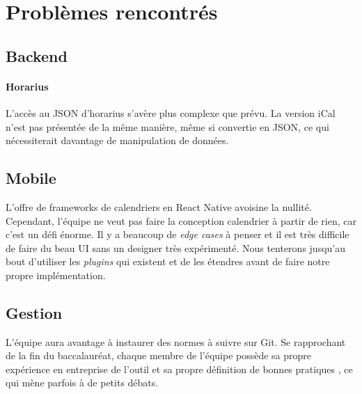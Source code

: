 \section{Problèmes rencontrés}
	\subsection{Backend}
	\paragraph{Horarius} L'accès au JSON d'horarius s'avère plus complexe que prévu. La version iCal n'est pas présentée de la même manière, même si convertie en JSON, ce qui nécessiterait davantage de manipulation de données.
	
	\subsection{Mobile}
	L'offre de frameworks de calendriers en React Native avoisine la nullité. Cependant, l'équipe ne veut pas faire la conception calendrier à partir de rien, car c'est un défi énorme. Il y a beaucoup de \emph{edge cases} à penser et il est très difficile de faire du beau UI sans un designer très expérimenté. Nous tenterons jusqu'au bout d'utiliser les \emph{plugins} qui existent et de les étendres avant de faire notre propre implémentation.
	
	\subsection{Gestion}
	L'équipe aura avantage à instaurer des normes à suivre sur Git. Se rapprochant de la fin du baccalauréat, chaque membre de l'équipe possède sa propre expérience en entreprise de l'outil et sa propre définition de \og bonnes pratiques \fg, ce qui mène parfois à de petits débats.